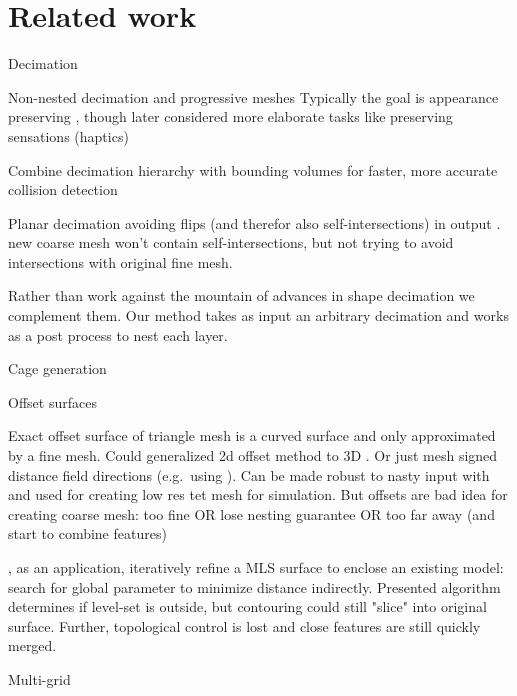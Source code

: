 \section{Related work}
\label{sec:related}

Decimation

Non-nested decimation \cite{Garland:1997:SSU} and progressive meshes
\cite{Hoppe:1996:PM} \cite{Melax98} Typically the goal is appearance preserving
\cite{Cohen:1998:AS}, though later considered more elaborate tasks like
preserving sensations (haptics) \cite{Otaduy:2003:SPS}

Combine decimation hierarchy with bounding volumes for faster, more accurate
collision detection
\cite{Otaduy:2003:CDH} 

Planar decimation avoiding flips (and therefor also self-intersections) in
output \cite{AnderssonGL09}.  \cite{gumhold2003intersection} new coarse mesh
won't contain self-intersections, but not trying to avoid intersections with
original fine mesh.

Rather than work against the mountain of advances in shape decimation we
complement them. Our method takes as input an arbitrary decimation and works as
a post process to nest each layer.

Cage generation

\cite{Deng:2011vr,Xian:2012tv}

Offset surfaces 

\cite{Campen:2010} Exact offset surface of triangle mesh is a curved surface
and only approximated by a fine mesh.  Could generalized 2d offset method
\cite{chen2005polygon} to 3D \cite{Jacobson:WN:2013}.  Or just mesh signed
distance field directions (e.g.\ using \cite{cgal}). Can be made robust to
nasty input with \cite{Xu:2014:SDF} and used for creating low res tet mesh for
simulation.
%
But offsets are bad idea for creating coarse mesh: too fine OR lose nesting
guarantee OR too far away (and start to combine features)

\cite{Shen:2004:IAI}, as an application, iteratively refine a MLS surface to
enclose an existing model: search for global parameter to minimize distance
indirectly. Presented algorithm determines if level-set is outside, but
contouring could still "slice" into original surface.  Further, topological
control is lost and close features are still quickly merged. 

Multi-grid 

